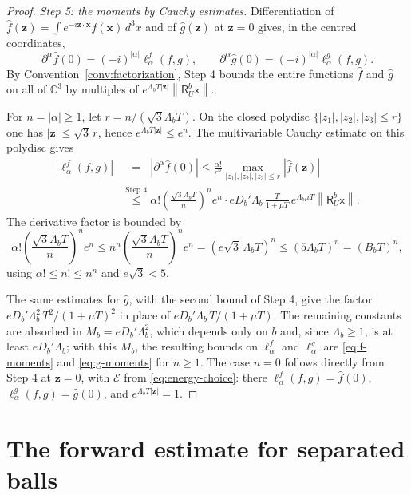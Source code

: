 \documentclass[11pt]{amsart}
\numberwithin{equation}{section}
\theoremstyle{definition}
\newcommand{\C}{\mathbb C}
\newcommand{\Res}{\mathsf R}
\newcommand{\sx}{\mathsf x}
\newcommand{\bx}{\mathbf x}
\newcommand{\bz}{\mathbf z}
\newcommand{\Energy}{\mathcal E}
\newcommand{\norm}[1]{\left\|#1\right\|}
\newcommand{\wh}[1]{\widehat{#1}}
\begin{document}
\begin{proof}
\smallskip
\emph{Step 5: the moments by Cauchy estimates.}
Differentiation of \(\wh f(\bz)=\int e^{-i\bz\cdot\bx}f(\bx)\,d^3x\)
and of \(\wh g(\bz)\) at \(\bz=0\) gives, in the centred coordinates,
\[
 \partial^\alpha\wh f(0)=(-i)^{|\alpha|}\ell_\alpha^f(f,g),\qquad
 \partial^\alpha\wh g(0)=(-i)^{|\alpha|}\ell_\alpha^g(f,g).
\]
By
Convention~\ref{conv:factorization}, Step 4 bounds the entire
functions \(\wh f\) and \(\wh g\) on all of \(\C^3\) by multiples of
\(e^{\Lambda_bT|\bz|}\norm{\Res_U^b\sx}\).

For \(n=|\alpha|\ge1\), let \(r=n/(\sqrt3\Lambda_bT)\). On the closed
polydisc \(\{|z_1|,|z_2|,|z_3|\le r\}\) one has \(|\bz|\le\sqrt3\,r\),
hence \(e^{\Lambda_bT|\bz|}\le e^n\). The multivariable Cauchy
estimate on this polydisc gives
\begin{align*}
 |\ell_\alpha^f(f,g)|
 &\overset{\phantom{\text{Step 4}}}{=}|\partial^\alpha\wh f(0)|
 \le\frac{\alpha!}{r^n}\max_{|z_1|,|z_2|,|z_3|\le r}|\wh f(\bz)|\\
 &\overset{\text{Step 4}}{\le}
 \alpha!\left(\frac{\sqrt3\Lambda_bT}{n}\right)^n e^n
 \cdot eD_b'\Lambda_b\,\frac{T}{1+\mu T}\,e^{\Lambda_b\mu T}
 \norm{\Res_U^b\sx}.
\end{align*}
The derivative factor is bounded by
\[
 \alpha!\left(\frac{\sqrt3\Lambda_bT}{n}\right)^n e^n
 \le n^n\left(\frac{\sqrt3\Lambda_bT}{n}\right)^n e^n
 =(e\sqrt3\,\Lambda_bT)^n
 \le(5\Lambda_bT)^n=(B_bT)^n,
\]
using \(\alpha!\le n!\le n^n\) and \(e\sqrt3<5\).

The same estimates
for \(\wh g\), with the second bound of Step 4, give the factor
\(eD_b'\Lambda_b^2\,T^2/(1+\mu T)^2\) in place of
\(eD_b'\Lambda_b\,T/(1+\mu T)\). The remaining constants are absorbed
in \(M_b=eD_b'\Lambda_b^2\), which depends only on \(b\) and, since
\(\Lambda_b\ge1\), is at least \(eD_b'\Lambda_b\); with this \(M_b\),
the resulting bounds on \(\ell_\alpha^f\) and \(\ell_\alpha^g\) are \eqref{eq:f-moments} and
\eqref{eq:g-moments} for \(n\ge1\). The case
\(n=0\) follows directly from Step 4 at \(\bz=0\), with \(\Energy\) from
\eqref{eq:energy-choice}: there \(\ell_\alpha^f(f,g)=\wh f(0)\),
\(\ell_\alpha^g(f,g)=\wh g(0)\), and \(e^{\Lambda_bT|\bz|}=1\).
\end{proof}

\section{The forward estimate for separated balls}\label{sec:forward}
\end{document}
